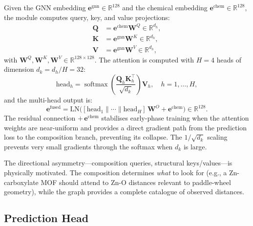 \documentclass[conference]{IEEEtran}
\DeclareMathOperator{\softmax}{softmax}
\begin{document}
Given the GNN embedding $\mathbf{e}^{\text{gnn}}\in\mathbb{R}^{128}$ and
the chemical embedding $\mathbf{e}^{\text{chem}}\in\mathbb{R}^{128}$, the
module computes query, key, and value projections:
\begin{align}
  \mathbf{Q} &= \mathbf{e}^{\text{chem}}\mathbf{W}^Q
               \in\mathbb{R}^{d_h},
  \label{eq:Qproj}\\
  \mathbf{K} &= \mathbf{e}^{\text{gnn}}\mathbf{W}^K
               \in\mathbb{R}^{d_h},
  \label{eq:Kproj}\\
  \mathbf{V} &= \mathbf{e}^{\text{gnn}}\mathbf{W}^V
               \in\mathbb{R}^{d_h},
  \label{eq:Vproj}
\end{align}
with $\mathbf{W}^Q,\mathbf{W}^K,\mathbf{W}^V\in\mathbb{R}^{128\times128}$.
The attention is computed with $H=4$ heads of dimension $d_k=d_h/H=32$:
\begin{equation}
  \text{head}_h
  = \softmax\!\left(\frac{\mathbf{Q}_h\mathbf{K}_h^\top}{\sqrt{d_k}}\right)
    \mathbf{V}_h,
  \quad h=1,\ldots,H,
  \label{eq:head_h}
\end{equation}
and the multi-head output is:
\begin{equation}
  \mathbf{e}^{\text{fused}}
  = \mathrm{LN}\!\bigl(
      [\text{head}_1\|\cdots\|\text{head}_H]\,\mathbf{W}^O
      + \mathbf{e}^{\text{chem}}
    \bigr)
  \in\mathbb{R}^{128}.
  \label{eq:cross_attn}
\end{equation}
The residual connection $+\,\mathbf{e}^{\text{chem}}$ stabilises early-phase
training when the attention weights are near-uniform and provides a direct
gradient path from the prediction loss to the composition branch, preventing
its collapse.  The $1/\sqrt{d_k}$ scaling prevents very small gradients
through the softmax when $d_k$ is large.

The directional asymmetry—composition queries, structural keys/values—is
physically motivated.  The composition determines \emph{what} to look for
(e.g., a Zn-carboxylate MOF should attend to Zn-O distances relevant to
paddle-wheel geometry), while the graph provides a complete catalogue of
observed distances.

\subsection{Prediction Head}
\label{sec:arch_head}
\end{document}
